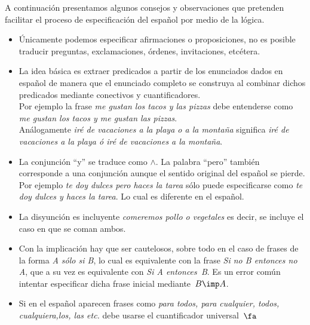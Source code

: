 \documentclass[11pt,letterpaper]{article}
\begin{document}
A continuación presentamos algunos consejos y observaciones que pretenden 
facilitar el proceso de especificación del español por medio de la lógica.
\begin{itemize}
 \item Únicamente podemos especificar afirmaciones o proposiciones, no es 
  posible traducir preguntas, exclamaciones, órdenes, invitaciones, etcétera.

 \item La idea básica es extraer predicados a partir de los enunciados dados 
  en español de manera que el enunciado completo se construya al combinar 
  dichos predicados mediante conectivos y cuantificadores.\\
  Por ejemplo la frase \textit{me gustan los tacos y las pizzas} debe entenderse 
  como \textit{me gustan los tacos y me gustan las pizzas}.\\
  Análogamente \textit{iré de vacaciones a la playa o a la montaña} significa 
  \textit{iré de vacaciones a la playa ó iré de vacaciones a la montaña}.

 \item La conjunción \enquote{y} se traduce como $\land$. La palabra 
  \enquote{pero} también corresponde a una conjunción aunque el sentido 
  original del español se pierde. \\ 
  Por ejemplo \textit{te doy dulces pero haces la tarea} sólo puede 
  especificarse como \textit{te doy dulces y haces la tarea}. Lo cual es 
  diferente en el español.

 \item La disyunción es incluyente \textit{comeremos pollo o vegetales} es 
  decir, se incluye el caso en que se coman ambos.

 \item Con la implicación hay que ser cautelosos, sobre todo en el caso de 
  frases de la forma  \textit{A sólo si B}, lo cual es equivalente con la frase
  \textit{Si no B entonces no A}, que a su vez es equivalente con        
  \textit{Si A entonces~B}. 
  Es un error común intentar especificar dicha frase inicial mediante~$B\imp A$.

 \item Si en el español aparecen frases como \textit{para todos, para 
cualquier,   todos, cualquiera,los, las etc.} debe usarse el cuantificador 
universal~$\fa$


\end{itemize}
\end{document}
